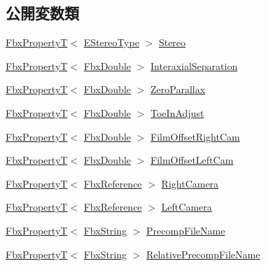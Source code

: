 \subsection*{公開変数類}
\begin{DoxyCompactItemize}
\item 
\hyperlink{class_fbx_property_t}{Fbx\+PropertyT}$<$ \hyperlink{class_fbx_camera_stereo_acb0f27675a73de0858983b703196cb37}{E\+Stereo\+Type} $>$ \hyperlink{class_fbx_camera_stereo_af7ab718dda255c4673813f0993cd143f}{Stereo}
\item 
\hyperlink{class_fbx_property_t}{Fbx\+PropertyT}$<$ \hyperlink{fbxtypes_8h_a171e72a1c46fc15c1a6c9c31948c1c5b}{Fbx\+Double} $>$ \hyperlink{class_fbx_camera_stereo_a93f63eb9bb9d1a9829db054abce1289d}{Interaxial\+Separation}
\item 
\hyperlink{class_fbx_property_t}{Fbx\+PropertyT}$<$ \hyperlink{fbxtypes_8h_a171e72a1c46fc15c1a6c9c31948c1c5b}{Fbx\+Double} $>$ \hyperlink{class_fbx_camera_stereo_ab76f0822d4543864dfe707ea8b3be50a}{Zero\+Parallax}
\item 
\hyperlink{class_fbx_property_t}{Fbx\+PropertyT}$<$ \hyperlink{fbxtypes_8h_a171e72a1c46fc15c1a6c9c31948c1c5b}{Fbx\+Double} $>$ \hyperlink{class_fbx_camera_stereo_ad869c71fad3c11ada97b96bceeda09ed}{Toe\+In\+Adjust}
\item 
\hyperlink{class_fbx_property_t}{Fbx\+PropertyT}$<$ \hyperlink{fbxtypes_8h_a171e72a1c46fc15c1a6c9c31948c1c5b}{Fbx\+Double} $>$ \hyperlink{class_fbx_camera_stereo_a91f409fc6af89147826e7eb0aae87184}{Film\+Offset\+Right\+Cam}
\item 
\hyperlink{class_fbx_property_t}{Fbx\+PropertyT}$<$ \hyperlink{fbxtypes_8h_a171e72a1c46fc15c1a6c9c31948c1c5b}{Fbx\+Double} $>$ \hyperlink{class_fbx_camera_stereo_adfb0e61258f415bd4e80d2a74071d2b5}{Film\+Offset\+Left\+Cam}
\item 
\hyperlink{class_fbx_property_t}{Fbx\+PropertyT}$<$ \hyperlink{fbxtypes_8h_a44df6a2eec915cf27cd481e5c5e48a24}{Fbx\+Reference} $>$ \hyperlink{class_fbx_camera_stereo_ae4bbaad53a1ebbc0534f78c246affd84}{Right\+Camera}
\item 
\hyperlink{class_fbx_property_t}{Fbx\+PropertyT}$<$ \hyperlink{fbxtypes_8h_a44df6a2eec915cf27cd481e5c5e48a24}{Fbx\+Reference} $>$ \hyperlink{class_fbx_camera_stereo_a92cc37f2c93f8920e66756ef4d947762}{Left\+Camera}
\item 
\hyperlink{class_fbx_property_t}{Fbx\+PropertyT}$<$ \hyperlink{class_fbx_string}{Fbx\+String} $>$ \hyperlink{class_fbx_camera_stereo_a25294714b9dfedce9180102396ebd7bc}{Precomp\+File\+Name}
\item 
\hyperlink{class_fbx_property_t}{Fbx\+PropertyT}$<$ \hyperlink{class_fbx_string}{Fbx\+String} $>$ \hyperlink{class_fbx_camera_stereo_af7d8b1be43665a8662630cdc2fdb0dbb}{Relative\+Precomp\+File\+Name}
\end{DoxyCompactItemize}
